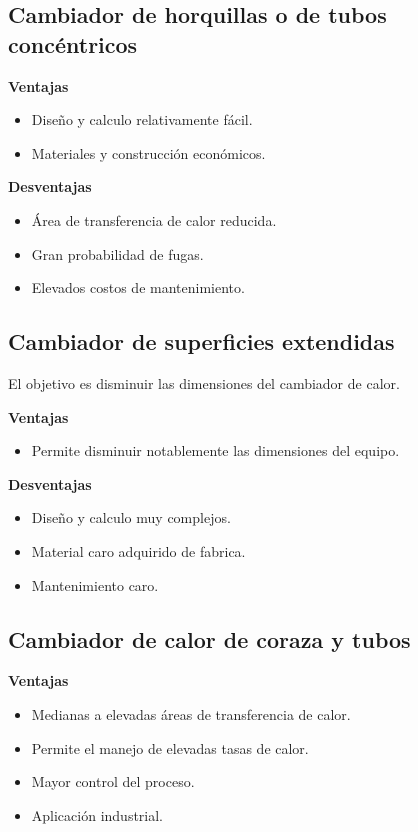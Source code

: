 \subsection{Cambiador de horquillas o de tubos concéntricos}


\textbf{Ventajas}
\begin{itemize}
    \item Diseño y calculo relativamente fácil.
    \item Materiales y construcción económicos.
\end{itemize}

\textbf{Desventajas}
\begin{itemize}
    \item Área de transferencia de calor reducida.
    \item Gran probabilidad de fugas.
    \item Elevados costos de mantenimiento.
\end{itemize}

\subsection{Cambiador de superficies extendidas}
El objetivo es disminuir las dimensiones del cambiador de calor.


\textbf{Ventajas}
\begin{itemize}
    \item Permite disminuir notablemente las dimensiones del equipo.
\end{itemize}

\textbf{Desventajas}
\begin{itemize}
    \item Diseño y calculo muy complejos.
    \item Material caro adquirido de fabrica.
    \item Mantenimiento caro.
\end{itemize}

\subsection{Cambiador de calor de coraza y tubos}


\textbf{Ventajas}
\begin{itemize}
    \item Medianas a elevadas áreas de transferencia de calor.
    \item Permite el manejo de elevadas tasas de calor.
    \item Mayor control del proceso.
    \item Aplicación industrial.
\end{itemize}


